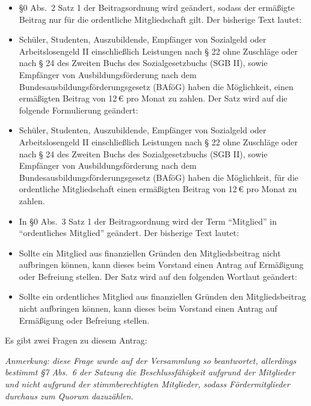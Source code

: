\documentclass[a4paper,12pt]{scrartcl}
\renewenvironment{quote}{%
  \list{}{\rightmargin\leftmargin}%
    \item\small\itshape\relax%
}{%
  \endlist
}
\begin{document}
\begin{itemize}
  \item §0 Abs.~2 Satz 1 der Beitragsordnung wird geändert, sodass der ermäßigte
    Beitrag nur für die ordentliche Mitgliedschaft gilt. Der bisherige Text
    lautet: 
    \begin{quote}
      Schüler, Studenten, Auszubildende, Empfänger von Sozialgeld oder
      Arbeitslosengeld II einschließlich Leistungen nach § 22 ohne Zuschläge
      oder nach § 24 des Zweiten Buchs des Sozialgesetzbuchs (SGB II), sowie
      Empfänger von Ausbildungsförderung nach dem
      Bundesausbildungsförderungsgesetz (BAföG) haben die Möglichkeit, einen
      ermäßigten Beitrag von 12\,€ pro Monat zu zahlen.
    \end{quote}
    Der Satz wird auf die folgende Formulierung geändert:
    \begin{quote}
      Schüler, Studenten, Auszubildende, Empfänger von Sozialgeld oder
      Arbeitslosengeld II einschließlich Leistungen nach § 22 ohne Zuschläge
      oder nach § 24 des Zweiten Buchs des Sozialgesetzbuchs (SGB II), sowie
      Empfänger von Ausbildungsförderung nach dem
      Bundesausbildungsförderungsgesetz (BAföG) haben die Möglichkeit, für die
      ordentliche Mitgliedschaft einen ermäßigten Beitrag von 12\,€ pro Monat zu
      zahlen.
    \end{quote}

  \item In §0 Abs.~3 Satz 1 der Beitragsordnung wird der Term "`Mitglied"' in
    "`ordentliches Mitglied"' geändert. Der bisherige Text lautet:
    \begin{quote}
      Sollte ein Mitglied aus finanziellen Gründen den Mitgliedsbeitrag
      nicht aufbringen können, kann dieses beim Vorstand einen Antrag auf
      Ermäßigung oder Befreiung stellen.
    \end{quote}
     Der Satz wird auf den folgenden Wortlaut geändert:
     \begin{quote}
        Sollte ein ordentliches Mitglied aus finanziellen Gründen den
        Mitgliedsbeitrag nicht aufbringen können, kann dieses beim Vorstand
        einen Antrag auf Ermäßigung oder Befreiung stellen.
     \end{quote}
\end{itemize}

Es gibt zwei Fragen zu diesem Antrag:

\emph{Anmerkung: diese Frage wurde auf der Versammlung so beantwortet,
allerdings bestimmt §7 Abs.~6 der Satzung die Beschlussfähigkeit aufgrund der
Mitglieder und nicht aufgrund der stimmberechtigten Mitglieder, sodass 
Fördermitglieder durchaus zum Quorum dazuzählen.}
\end{document}
